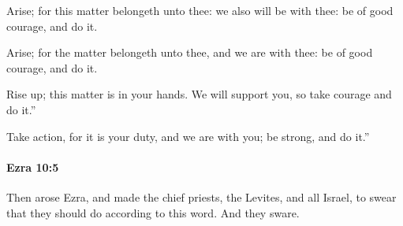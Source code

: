 			Arise; for this matter belongeth unto thee: we also will be with thee: be of good courage, and do it.

			\begin{versebox}
					\item[BHS] 
					\item[LXX] 
					\item[ASV] Arise; for the matter belongeth unto thee, and we are with thee: be of good courage, and do it.
					\item[NIV] Rise up; this matter is in your hands. We will support you, so take courage and do it.”
					\item[NRSV] Take action, for it is your duty, and we are with you; be strong, and do it.”
			\end{versebox}

		\paragraph{Ezra 10:5} %
			\label{EZRA-10-5}

			Then arose Ezra, and made the chief priests, the Levites, and all Israel, to swear that they should do according to this word. And they sware.

